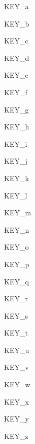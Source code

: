 KEY\_\-a \par
 KEY\_\-b \par
 KEY\_\-c \par
 KEY\_\-d \par
 KEY\_\-e \par
 KEY\_\-f \par
 KEY\_\-g \par
 KEY\_\-h \par
 KEY\_\-i \par
 KEY\_\-j \par
 KEY\_\-k \par
 KEY\_\-l \par
 KEY\_\-m \par
 KEY\_\-n \par
 KEY\_\-o \par
 KEY\_\-p \par
 KEY\_\-q \par
 KEY\_\-r \par
 KEY\_\-s \par
 KEY\_\-t \par
 KEY\_\-u \par
 KEY\_\-v \par
 KEY\_\-w \par
 KEY\_\-x \par
 KEY\_\-y \par
 KEY\_\-z \par
 